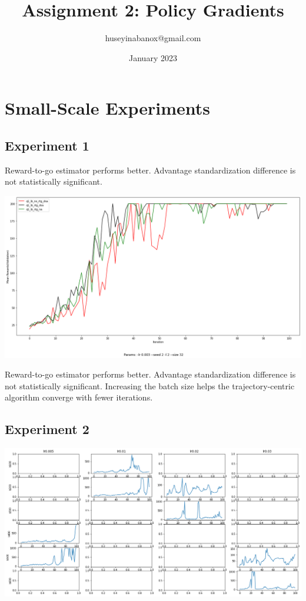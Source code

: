 \documentclass[11pt]{article}
\title{Assignment 2: Policy Gradients}
\author{huseyinabanox@gmail.com}
\date{January 2023}
\begin{document}
    \maketitle

    \section{Small-Scale Experiments}

    \subsection{Experiment 1}




    Reward-to-go estimator performs better.
    Advantage standardization difference is not statistically significant.


    \hspace*{-0.5in}
    \includegraphics[scale=0.35]{q1/q1_lb_plot}

    Reward-to-go estimator performs better.
    Advantage standardization difference is not statistically significant.
    Increasing the batch size helps the trajectory-centric algorithm converge with fewer iterations.


    \subsection{Experiment 2}

    \hspace*{-0.5in}
    \includegraphics[scale=0.35]{q2/q2_grid_plot}
\end{document}
